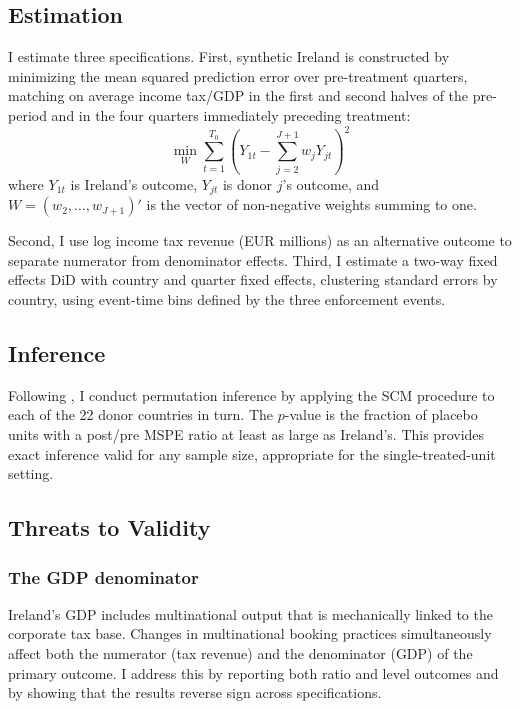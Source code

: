 \documentclass[12pt]{article}
\begin{document}
\subsection{Estimation}

I estimate three specifications. First, synthetic Ireland is constructed by minimizing the mean squared prediction error over pre-treatment quarters, matching on average income tax/GDP in the first and second halves of the pre-period and in the four quarters immediately preceding treatment:
\begin{equation}
\min_{W} \sum_{t=1}^{T_0} \left( Y_{1t} - \sum_{j=2}^{J+1} w_j Y_{jt} \right)^2
\end{equation}
where $Y_{1t}$ is Ireland's outcome, $Y_{jt}$ is donor $j$'s outcome, and $W = (w_2, \ldots, w_{J+1})'$ is the vector of non-negative weights summing to one.

Second, I use log income tax revenue (EUR millions) as an alternative outcome to separate numerator from denominator effects. Third, I estimate a two-way fixed effects DiD with country and quarter fixed effects, clustering standard errors by country, using event-time bins defined by the three enforcement events.

\subsection{Inference}

Following \citet{abadie2010synthetic}, I conduct permutation inference by applying the SCM procedure to each of the 22 donor countries in turn. The $p$-value is the fraction of placebo units with a post/pre MSPE ratio at least as large as Ireland's. This provides exact inference valid for any sample size, appropriate for the single-treated-unit setting.

\subsection{Threats to Validity}

\subsubsection*{The GDP denominator} Ireland's GDP includes multinational output that is mechanically linked to the corporate tax base. Changes in multinational booking practices simultaneously affect both the numerator (tax revenue) and the denominator (GDP) of the primary outcome. I address this by reporting both ratio and level outcomes and by showing that the results reverse sign across specifications.
\end{document}
